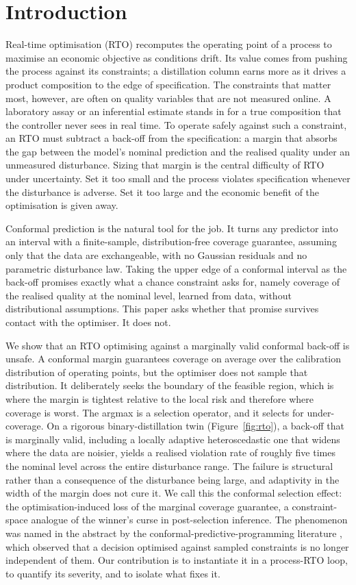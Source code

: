 \documentclass[review,times]{elsarticle}
\begin{document}
\section{Introduction}
\label{sec:intro}

Real-time optimisation (RTO) recomputes the operating point of a process to maximise an
economic objective as conditions drift. Its value comes from pushing the process against
its constraints; a distillation column earns more as it drives a product composition to
the edge of specification. The constraints that matter most, however, are often on quality
variables that are not measured online. A laboratory assay or an inferential estimate
stands in for a true composition that the controller never sees in real time. To operate
safely against such a constraint, an RTO must subtract a back-off from the specification: a
margin that absorbs the gap between the model's nominal prediction and the realised quality
under an unmeasured disturbance. Sizing that margin is the central difficulty of RTO under
uncertainty. Set it too small and the process violates specification whenever the
disturbance is adverse. Set it too large and the economic benefit of the optimisation is
given away.

Conformal prediction is the natural tool for the job. It turns any predictor into an
interval with a finite-sample, distribution-free coverage guarantee, assuming only that the
data are exchangeable, with no Gaussian residuals and no parametric disturbance law. Taking
the upper edge of a conformal interval as the back-off promises exactly what a chance
constraint asks for, namely coverage of the realised quality at the nominal level, learned
from data, without distributional assumptions. This paper asks whether that promise survives
contact with the optimiser. It does not.

We show that an RTO optimising against a marginally valid conformal back-off is unsafe. A
conformal margin guarantees coverage on average over the calibration distribution of
operating points, but the optimiser does not sample that distribution. It deliberately
seeks the boundary of the feasible region, which is where the margin is tightest relative
to the local risk and therefore where coverage is worst. The argmax is a selection
operator, and it selects for under-coverage. On a rigorous binary-distillation twin
(Figure~\ref{fig:rto}), a back-off that is marginally valid, including a locally adaptive
heteroscedastic one that widens where the data are noisier, yields a realised violation
rate of roughly five times the nominal level across the entire disturbance range. The
failure is structural rather than a consequence of the disturbance being large, and
adaptivity in the width of the margin does not cure it. We call this the conformal
selection effect: the optimisation-induced loss of the marginal coverage guarantee, a
constraint-space analogue of the winner's curse in post-selection inference. The phenomenon
was named in the abstract by the conformal-predictive-programming literature
\citep{zhao2024cpp}, which observed that a decision optimised against sampled constraints is
no longer independent of them. Our contribution is to instantiate it in a process-RTO loop,
to quantify its severity, and to isolate what fixes it.
\end{document}
